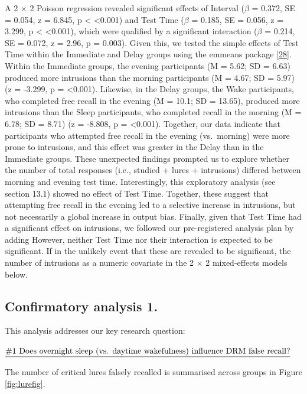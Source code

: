 \documentclass[
]{article}
\begin{document}
A 2 \(\times\) 2 Poisson regression revealed significant effects of Interval (\(\beta\) = 0.372, SE = 0.054, z = 6.845, p \textless{} \textless0.001) and Test Time (\(\beta\) = 0.185, SE = 0.056, z = 3.299, p \textless{} \textless0.001), which were qualified by a significant interaction (\(\beta\) = 0.214, SE = 0.072, z = 2.96, p = 0.003). Given this, we tested the simple effects of Test Time within the Immediate and Delay groups using the emmeans package {[}\protect\hyperlink{ref-lenth2021a}{28}{]}. Within the Immediate groups, the evening participants (M = 5.62; SD = 6.63) produced more intrusions than the morning participants (M = 4.67; SD = 5.97) (z = -3.299, p = \textless0.001). Likewise, in the Delay groups, the Wake participants, who completed free recall in the evening (M = 10.1; SD = 13.65), produced more intrusions than the Sleep participants, who completed recall in the morning (M = 6.78; SD = 8.71) (z = -8.808, p = \textless0.001). Together, our data indicate that participants who attempted free recall in the evening (vs.~morning) were more prone to intrusions, and this effect was greater in the Delay than in the Immediate groups. These unexpected findings prompted us to explore whether the number of total responses (i.e., studied + lures + intrusions) differed between morning and evening test time. Interestingly, this exploratory analysis (see section 13.1) showed no effect of Test Time. Together, these suggest that attempting free recall in the evening led to a selective increase in intrusions, but not necessarily a global increase in output bias. Finally, given that Test Time had a significant effect on intrusions, we followed our pre-registered analysis plan by adding However, neither Test Time nor their interaction is expected to be significant. If in the unlikely event that these are revealed to be significant, the number of intrusions as a numeric covariate in the 2 \(\times\) 2 mixed-effects models below.

\hypertarget{confirmatory-analysis-1.}{%
\subsection{Confirmatory analysis 1.}\label{confirmatory-analysis-1.}}

This analysis addresses our key research question:

\(\text{\underline{\#1 Does overnight sleep (vs. daytime wakefulness) influence DRM false recall?}}\)

The number of critical lures falsely recalled is summarised across groups in Figure \ref{fig:lurefig}.
\end{document}

